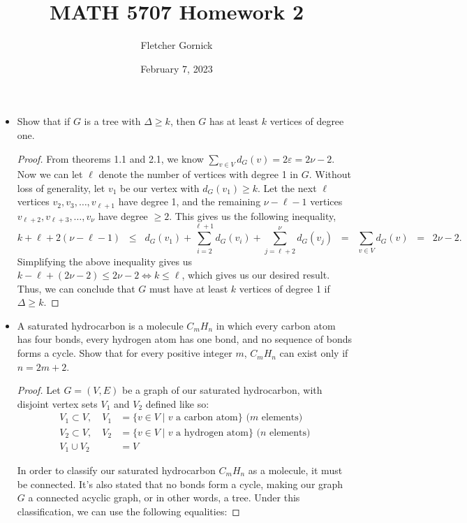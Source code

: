 \documentclass[11pt]{article}
\title{\vspace{-1.0cm}MATH 5707 Homework 2}
\author{Fletcher Gornick}
\date{February 7, 2023}
\newcommand\itm[1]{\item[\textbf{#1}]}
\begin{document}
\maketitle
\begin{itemize}
  \itm{2.1.6} Show that if \(G\) is a tree with \(\Delta \geq k\), then \(G\) has at least \(k\) vertices of degree one.
  \begin{proof}
    From theorems 1.1 and 2.1, we know \(\displaystyle\sum_{v \in V} d_G(v) = 2\varepsilon = 2\nu - 2.\)
    Now we can let \(\ell\) denote the number of vertices with degree 1 in \(G\).  Without loss of generality, let \(v_1\) be our vertex with \(d_G(v_1) \geq k\).  Let the next \(\ell\) vertices \(v_2,v_3,\hdots,v_{\ell + 1}\) have degree 1, and the remaining \(\nu - \ell - 1\) vertices \(v_{\ell+2}, v_{\ell+3}, \hdots, v_{\nu}\) have degree \(\geq 2\).  This gives us the following inequality,
    \[k + \ell + 2(\nu - \ell - 1) \;\;\leq\;\; d_G(v_1) + \sum_{i=2}^{\ell + 1} d_G(v_i) + \sum_{j=\ell+2}^{\nu} d_G(v_j) \;\;=\;\; \sum_{v \in V} d_G(v) \;\;=\;\; 2\nu - 2.\]
    Simplifying the above inequality gives us \(k - \ell + (2\nu - 2) \leq 2\nu - 2 \iff k \leq \ell\), which gives us our desired result.  Thus, we can conclude that \(G\) must have at least \(k\) vertices of degree 1 if \(\Delta \geq k\).
  \end{proof}
  



  \itm{2.1.12} A saturated hydrocarbon is a molecule \(C_m H_n\) in which every carbon atom has four bonds, every hydrogen atom has one bond, and no sequence of bonds forms a cycle.  Show that for every positive integer \(m\), \(C_m H_n\) can exist only if \(n = 2m + 2\).
  \begin{proof}
    Let \(G = (V, E)\) be a graph of our saturated hydrocarbon, with disjoint vertex sets \(V_1\) and \(V_2\) defined like so:
    \begin{align*}
      V_1 \subset V, \quad V_1 &= \{v \in V \mid v \text{ a carbon atom}\}  \text{ (\(m\) elements)} \\
      V_2 \subset V, \quad V_2 &= \{v \in V \mid v \text{ a hydrogen atom}\}  \text{ (\(n\) elements)} \\
      V_1 \cup V_2 &= V
    \end{align*}

    In order to classify our saturated hydrocarbon \(C_m H_n\) as a molecule, it must be connected.  It's also stated that no bonds form a cycle, making our graph \(G\) a connected acyclic graph, or in other words, a tree.  Under this classification, we can use the following equalities:


\end{proof}
\end{itemize}
\end{document}
